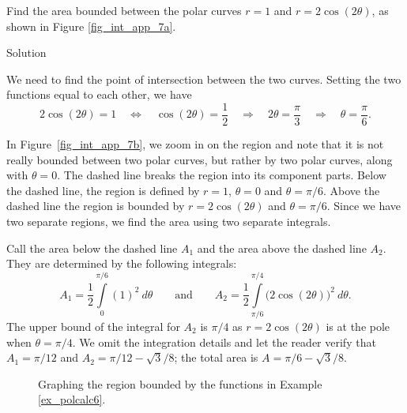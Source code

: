 \begin{example}\label{ex_polcalc6}
Find the area bounded between the polar curves $r=1$ and $r=2\cos(2\theta)$, as shown in Figure \ref{fig_int_app_7a}.



Solution 

We need to find the point of intersection between the two curves. Setting the two functions equal to each other, we have
$$2\cos(2\theta) = 1 \quad \Leftrightarrow \quad \cos(2\theta) = \frac12 \quad \Rightarrow \quad 2\theta = \dfrac{\pi}{3}\quad \Rightarrow \quad \theta=\dfrac{\pi}{6}.$$

In Figure~\ref{fig_int_app_7b}, we zoom in on the region and note that it is not really bounded between two polar curves, but rather by two polar curves, along with $\theta=0$. The dashed line breaks the region into its component parts. Below the dashed line, the region is defined by $r=1$, $\theta=0$ and $\theta = \pi/6$. Above the dashed line the region is bounded by $r=2\cos(2\theta)$ and $\theta =\pi/6$. Since we have two separate regions, we find the area using two separate integrals.

Call the area below the dashed line $A_1$ and the area above the dashed line $A_2$. They are determined by the following integrals:
$$A_1 = \frac12\int\limits_0^{\pi/6} (1)^2\ d\theta \qquad \text{and} \qquad A_2 = \frac12\int\limits_{\pi/6}^{\pi/4} \big(2\cos(2\theta)\big)^2\ d\theta.$$
The upper bound of the integral for $A_2$ is $\pi/4$ as $r=2\cos(2\theta)$ is at the pole when $\theta=\pi/4$.
We omit the integration details and let the reader verify that $A_1 = \pi/12$ and $A_2 = \pi/12-\sqrt{3}/8$; the total area is $A = \pi/6-\sqrt{3}/8$.

\begin{figure}[H]
\centering
\qquad
{}
\caption{Graphing the region bounded by the functions in Example \ref{ex_polcalc6}.}
\end{figure}



\end{example}
